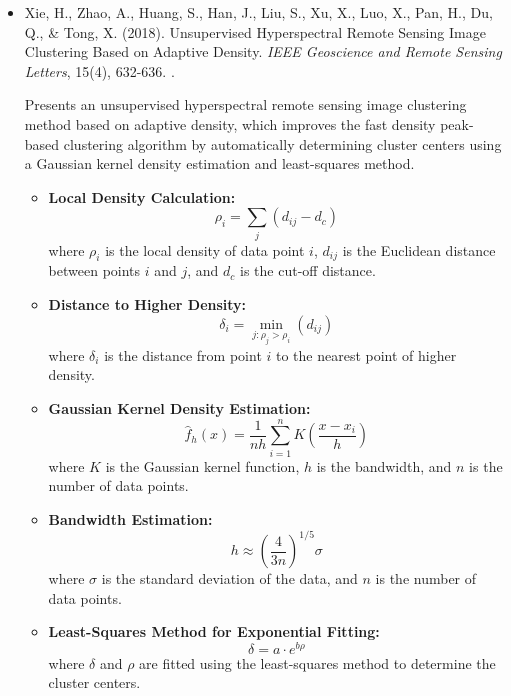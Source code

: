 \documentclass[10pt,svgnames,fragile]{beamer}
\begin{document}
\begin{frame}
\tiny
\begin{itemize}

\item Xie, H., Zhao, A., Huang, S., Han, J., Liu, S., Xu, X., Luo, X., Pan, H., Du, Q., & Tong, X. (2018). Unsupervised Hyperspectral Remote Sensing Image Clustering Based on Adaptive Density. \textit{IEEE Geoscience and Remote Sensing Letters}, 15(4), 632-636. \href{https://doi.org/10.1109/LGRS.2017.2786732}{\color{blue}{DOI: 10.1109/LGRS.2017.2786732}}. \cite{xieUnsupervisedHyperspectralRemote2018}

{\color{gray}Presents an unsupervised hyperspectral remote sensing image clustering method based on adaptive density, which improves the fast density peak-based clustering algorithm by automatically determining cluster centers using a Gaussian kernel density estimation and least-squares method.}
\begin{itemize} \tiny
    \item \textbf{Local Density Calculation:}
    \[
    \rho_i = \sum_{j} (d_{ij} - d_c)
    \]
    where \( \rho_i \) is the local density of data point \( i \), \( d_{ij} \) is the Euclidean distance between points \( i \) and \( j \), and \( d_c \) is the cut-off distance.

    \item \textbf{Distance to Higher Density:}
    \[
    \delta_i = \min_{j:\rho_j>\rho_i} (d_{ij})
    \]
    where \( \delta_i \) is the distance from point \( i \) to the nearest point of higher density.

    \item \textbf{Gaussian Kernel Density Estimation:}
    \[
    \hat{f}_h(x) = \frac{1}{nh} \sum_{i=1}^{n} K \left( \frac{x - x_i}{h} \right)
    \]
    where \( K \) is the Gaussian kernel function, \( h \) is the bandwidth, and \( n \) is the number of data points.

    \item \textbf{Bandwidth Estimation:}
    \[
    h \approx \left( \frac{4}{3n} \right)^{1/5} \sigma
    \]
    where \( \sigma \) is the standard deviation of the data, and \( n \) is the number of data points.

    \item \textbf{Least-Squares Method for Exponential Fitting:}
    \[
    \delta = a \cdot e^{b \rho}
    \]
    where \( \delta \) and \( \rho \) are fitted using the least-squares method to determine the cluster centers.
\end{itemize}


\end{itemize}
\end{frame}
\end{document}
